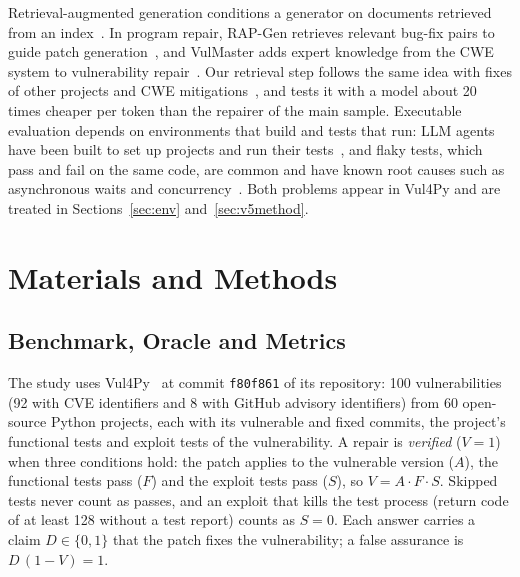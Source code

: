 \documentclass[ai,article,submit,oneauthor]{Definitions/mdpi}
\begin{document}
Retrieval-augmented generation conditions a generator on documents retrieved from an index~\cite{Lewis2020RetrievalAugmentedGeneration}. In program repair, RAP-Gen retrieves relevant bug-fix pairs to guide patch generation~\cite{Wang2023RapGenRetrieval}, and VulMaster adds expert knowledge from the CWE system to vulnerability repair~\cite{Zhou2024OutOfSight}. Our retrieval step follows the same idea with fixes of other projects and CWE mitigations~\cite{MITRE2026CweList}, and tests it with a model about 20 times cheaper per token than the repairer of the main sample. Executable evaluation depends on environments that build and tests that run: LLM agents have been built to set up projects and run their tests~\cite{Bouzenia2025YouNameIt}, and flaky tests, which pass and fail on the same code, are common and have known root causes such as asynchronous waits and concurrency~\cite{Luo2014EmpiricalAnalysisFlaky}. Both problems appear in Vul4Py and are treated in Sections~\ref{sec:env} and~\ref{sec:v5method}.

\section{Materials and Methods}\label{sec:methods}

\subsection{Benchmark, Oracle and Metrics}\label{sec:metrics}

The study uses Vul4Py~\cite{Bui2026Vul4pyBenchmarkingAutomated} at commit \texttt{f80f861} of its repository: 100 vulnerabilities (92 with CVE identifiers and 8 with GitHub advisory identifiers) from 60 open-source Python projects, each with its vulnerable and fixed commits, the project's functional tests and exploit tests of the vulnerability. A repair is \emph{verified} ($V=1$) when three conditions hold: the patch applies to the vulnerable version ($A$), the functional tests pass ($F$) and the exploit tests pass ($S$), so $V=A\cdot F\cdot S$. Skipped tests never count as passes, and an exploit that kills the test process (return code of at least 128 without a test report) counts as $S=0$. Each answer carries a claim $D\in\{0,1\}$ that the patch fixes the vulnerability; a false assurance is $D\,(1-V)=1$.
\end{document}
